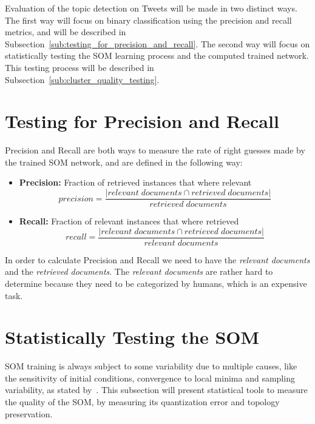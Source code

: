 
Evaluation of the topic detection on Tweets will be made in two distinct ways. The first way will focus on  binary classification using the precision and recall metrics, and will be described in Subsection~\ref{sub:testing_for_precision_and_recall}. The second way will focus on statistically testing the SOM learning process and the computed trained network. This testing process will be described in Subsection~\ref{sub:cluster_quality_testing}. 

\section{Testing for Precision and Recall} 
\label{sec:testing_for_precision_and_recall}
Precision and Recall are both ways to measure the rate of right guesses made by the trained SOM network, and are defined in the following way:
\begin{itemize}
  \item \textbf{Precision:} Fraction of retrieved instances that where relevant 
    \begin{equation}
      precision = \frac{|{relevant\;documents}\cap{retrieved\;documents}|}{{retrieved\;documents}}
    \end{equation} 
  \item \textbf{Recall:} Fraction of relevant instances that where retrieved
   \begin{equation}
      recall = \frac{|{relevant\;documents}\cap{retrieved\;documents}|}{{relevant\;documents}} 
    \end{equation} 
\end{itemize}

In order to calculate Precision and Recall we need to have the \emph{relevant documents} and the \emph{retrieved documents}. The \emph{relevant documents} are rather hard to determine because they need to be categorized by humans, which is an expensive task.

\section{Statistically Testing the SOM} 
\label{sec:cluster_quality_testing}
SOM training is always subject to some variability due to multiple causes, like the sensitivity of initial conditions, convergence to local minima and sampling variability, as stated by~\citet{Bodt}. This subsection will present statistical tools to measure the quality of the SOM, by measuring its quantization error and topology preservation.

